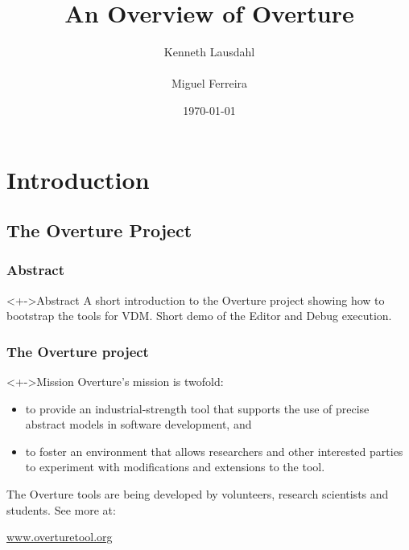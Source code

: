 \documentclass[slidestop,uncompress,mathserif,notes]{beamer}
\title{An Overview of Overture}
\author[K. Lausdahl, M. Ferreira]{
  Kenneth Lausdahl \\
  \mail{kenneth AT lausdahl.com} \\
  Miguel Ferreira \\
  \mail{m.ferreira AT sig.nl}
}
\date{\today}
\begin{document}
\frame{\titlepage}

\section[Outline]{}
\frame{\tableofcontents}

\section{Introduction}
\subsection{The Overture Project}
\frame
{
  \frametitle{Abstract}

\begin{block}<+->{Abstract}
A short introduction to the Overture project showing how to bootstrap the tools for VDM. Short demo of the Editor and Debug execution.
\end{block}


}


\frame
{
  \frametitle{The Overture project}

\begin{block}<+->{Mission}
	Overture's mission is twofold: 
  \begin{itemize}
  		\item to provide an industrial-strength tool that supports the use of precise abstract models in software development, and 
  		\item to foster an environment that allows researchers and other interested parties to experiment with modifications and extensions to the tool.      

  \end{itemize}
\end{block}

The Overture tools are being developed by volunteers, research scientists and students. See more at:
\begin{center}
\href{www.overturetool.org}{www.overturetool.org}
\end{center}

}
\end{document}
